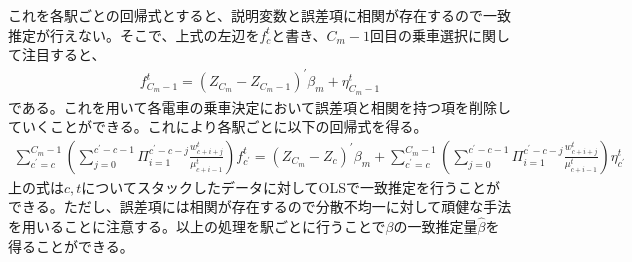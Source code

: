 \documentclass{jsarticle}
\begin{document}
これを各駅ごとの回帰式とすると、説明変数と誤差項に相関が存在するので一致推定が行えない。そこで、上式の左辺を$f_c^t$と書き、$C_m-1$回目の乗車選択に関して注目すると、
\begin{align*}
	f_{C_m-1}^t = \left( Z_{C_m} - Z_{C_m-1} \right)^{'} \beta_m + \eta_{C_m-1}^t
\end{align*}
である。これを用いて各電車の乗車決定において誤差項と相関を持つ項を削除していくことができる。これにより各駅ごとに以下の回帰式を得る。
\begin{align*}
	\sum_{c^{'} = c}^{C_m-1} \left( \sum_{j = 0}^{c^{'} -c -1} \Pi_{i = 1}^{c^{'} - c-j} \frac{w_{c+i+j}^t}{\mu_{c + i-1}^t} \right) f_{c^{'}}^t = (Z_{C_m} - Z_c)^{'} \beta_m + \sum_{c^{'} = c}^{C_m-1} \left( \sum_{j = 0}^{c^{'} -c -1} \Pi_{i = 1}^{c^{'} - c-j} \frac{w_{c+i+j}^t}{\mu_{c + i-1}^t} \right) \eta_{c^{'}}^t
\end{align*}
上の式は$c,t$についてスタックしたデータに対してOLSで一致推定を行うことができる。ただし、誤差項には相関が存在するので分散不均一に対して頑健な手法を用いることに注意する。以上の処理を駅ごとに行うことで$\beta$の一致推定量$\hat{\beta}$を得ることができる。
\end{document}
